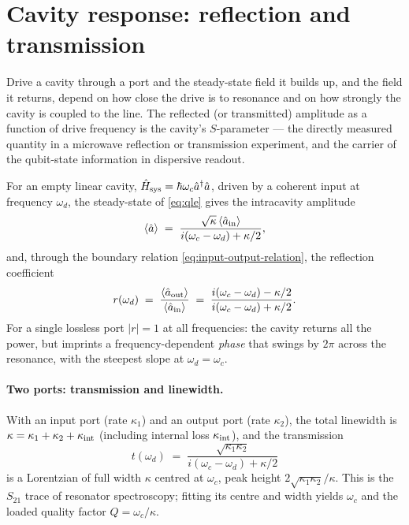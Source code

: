 \section{Cavity response: reflection and transmission}
\label{sec:cavity-response}

\begin{phenomenon}
Drive a cavity through a port and the steady-state field it builds
up, and the field it returns, depend on how close the drive is to
resonance and on how strongly the cavity is coupled to the line.
The reflected (or transmitted) amplitude as a function of drive
frequency is the cavity's $S$-parameter --- the directly measured
quantity in a microwave reflection or transmission experiment, and
the carrier of the qubit-state information in dispersive readout.
\end{phenomenon}

\begin{statement}
\label{stmt:reflection}
For an empty linear cavity, $\hat{H}_{\rm sys}=\hbar\omega_c\hat a^\dagger\hat a$,
driven by a coherent input at frequency $\omega_d$, the steady-state
of \cref{eq:qle} gives the intracavity amplitude
\begin{equation}
\label{eq:intracavity}
\langle\hat a\rangle \;=\; \frac{\sqrt{\kappa}\,\langle\hat a_{\rm in}\rangle}{i(\omega_c-\omega_d) + \kappa/2},
\end{equation}
and, through the boundary relation \cref{eq:input-output-relation},
the reflection coefficient
\begin{equation}
\label{eq:reflection}
r(\omega_d) \;=\; \frac{\langle\hat a_{\rm out}\rangle}{\langle\hat a_{\rm in}\rangle}
\;=\; \frac{i(\omega_c-\omega_d) - \kappa/2}{i(\omega_c-\omega_d) + \kappa/2}.
\end{equation}
For a single lossless port $|r|=1$ at all frequencies: the cavity
returns all the power, but imprints a frequency-dependent
\emph{phase} that swings by $2\pi$ across the resonance, with the
steepest slope at $\omega_d=\omega_c$.
\end{statement}

\paragraph{Two ports: transmission and linewidth.}
With an input port (rate $\kappa_1$) and an output port (rate
$\kappa_2$), the total linewidth is $\kappa=\kappa_1+\kappa_2+\kappa_{\rm int}$
(including internal loss $\kappa_{\rm int}$), and the transmission
\begin{equation}
\label{eq:transmission}
t(\omega_d) \;=\; \frac{\sqrt{\kappa_1\kappa_2}}{i(\omega_c-\omega_d)+\kappa/2}
\end{equation}
is a Lorentzian of full width $\kappa$ centred at $\omega_c$, peak
height $2\sqrt{\kappa_1\kappa_2}/\kappa$. This is the $S_{21}$ trace
of resonator spectroscopy; fitting its centre and width yields
$\omega_c$ and the loaded quality factor $Q=\omega_c/\kappa$.

